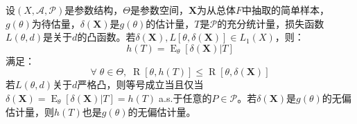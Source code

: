 \begin{theorem}
	\label{theo:Rao-Blackwell}
	设$(X,\mathscr{A},\mathscr{P})$是参数结构，$\Theta$是参数空间，$\mathbf{X}$为从总体$F$中抽取的简单样本，$g(\theta)$为待估量，$\delta(\mathbf{X})$是$g(\theta)$的估计量，$T$是$\mathscr{P}$的充分统计量，损失函数$L(\theta,d)$是关于$d$的凸函数。若$\delta(\mathbf{X}),L[\theta,\delta(\mathbf{X})]\in L_1(X)$，则：
	\begin{equation*}
		h(T)=\operatorname{E}_{\theta}[\delta(\mathbf{X})|T]
	\end{equation*}
	满足：
	\begin{equation*}
		\forall\;\theta\in\Theta,\;\operatorname{R}[\theta,h(T)]\leqslant\operatorname{R}[\theta,\delta(\mathbf{X})]
	\end{equation*}
	若$L(\theta,d)$关于$d$严格凸，则等号成立当且仅当$\delta(\mathbf{X})=\operatorname{E}_{\theta}[\delta(\mathbf{X})|T]=h(T)\;$a.s.于任意的$P\in\mathscr{P}$。若$\delta(\mathbf{X})$是$g(\theta)$的无偏估计量，则$h(T)$也是$g(\theta)$的无偏估计量。
\end{theorem}
